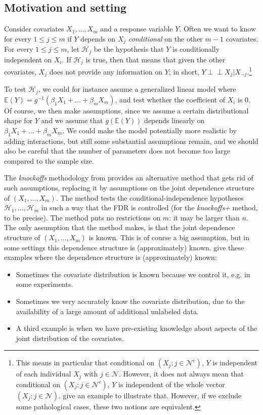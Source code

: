 \documentclass[11pt]{article}
\theoremstyle{plain}
\theoremstyle{definition}
\newcommand{\N}{\mathcal{N}}
\newcommand{\Hy}{\mathcal{H}}
\newcommand{\citt}{\citet}
\newcommand{\indep}{\mathrel{\perp\!\!\!\perp}}
\begin{document}
\subsection{Motivation and setting}
Consider covariates $X_1,...,X_m$ and a response variable $Y$.
Often we want to know for every $1\leq j \leq m$ if  $Y$ depends on  $X_j$ \emph{conditional} on the other $m-1$ covariates. For every $1\leq j \leq m$, let $\Hy_j$ be the hypothesis that $Y$ is conditionally independent on $X_i$. If $\Hy_j$ is true, then that means that given the other covariates, $X_j$ does not provide any information on $Y$; in short, $Y\indep X_j|X_{-j}$.\footnote{This means in particular that conditional on $(X_j:j\in \N^c)$, $Y$ is independent of each individual $X_j$ with $j\in \N$.
However, it does not always mean that conditional on $(X_j:j\in \N^c)$, $Y$ is independent of the whole vector $(X_j:j\in \N)$. \citt[][pp.557-558]{candes2018panning} give an example to illustrate that.
However, if we exclude some pathological cases, these two notions are equivalent.}



To test $\Hy_j$, we could for instance assume a generalized linear model where $\mathbb{E}(Y)= g^{-1}(\beta_1X_1+...+\beta_mX_m)$, and test whether the coefficient of  $X_i$ is 0. Of course, we then make assumptions, since we assume a certain distributional shape for $Y$ and we assume that $g(\mathbb{E}(Y))$ depends linearly on $\beta_1X_1+...+\beta_mX_m$. We could make the model potentially more realistic by adding interactions, but still some substantial assumptions remain, and we should also be careful that the number of parameters does not become too large compared to the sample size.

The \emph{knockoffs} methodology from \citt{candes2018panning} provides an alternative method that gets rid of such assumptions, replacing it by assumptions on the joint dependence structure of $(X_1,...,X_m)$. The method tests the conditional-independence hypotheses $\Hy_1,...,\Hy_m$ in such a way that the FDR is controlled (for the \emph{knockoffs+} method, to be precise). The method puts no restrictions on $m$: it may be larger than $n$. The only assumption that the method makes, is that the joint dependence structure of $(X_1,...,X_m)$ is known. This is of course a big assumption, but in some settings this dependence structure is (approximately) known. \citt[][p.554-555]{candes2018panning} give these examples where the dependence structure is (approximately) known:
\begin{itemize}
\item Sometimes the covariate distribution is known because we control it, e.g. in some experiments.
\item Sometimes we very accurately know the covariate distribution, due to the availability of a large amount of additional unlabeled data.
\item A third example is when we have  pre-existing knowledge about aspects of the joint distribution of the covariates.
\end{itemize}
\end{document}
